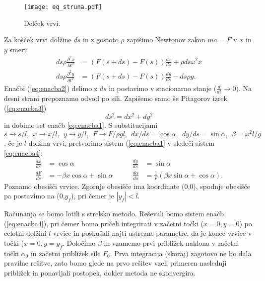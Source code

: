 \documentclass[12pt,a4paper]{article}
\begin{document}
\begin{figure}[H]
    \centering
        \texttt{[image: eq\_struna.pdf]}
    \caption{Delček vrvi.} \label{fig:slika2}
\end{figure}
\noindent Za košček vrvi dolžine $ds$ in z gostoto $\rho$ zapišimo Newtonov zakon $m a=F$ v $x$ in $y$ smeri:
\begin{align} \label{eq:enacba2}
ds \rho \frac{\partial ^{2} x}{\partial t^{2}} & =  (F(s +ds) - F(s)) \frac{dx}{ds} + \rho ds \omega ^{2} x \nonumber \\
ds \rho \frac{\partial ^{2} y}{\partial t^{2}} & =  (F(s +ds) - F(s)) \frac{dy}{ds} - ds \rho g.
\end{align}
Enačbi (\ref{eq:enacba2}) delimo z $ds$ in postavimo v stacionarno stanje ($\frac{d}{dt} \rightarrow 0)$. Na desni strani prepoznamo odvod po sili. Zapišemo samo še Pitagorov izrek (\ref{eq:enacba3})
\begin{equation} \label{eq:enacba3}
ds^{2}  = dx^{2} +dy^{2}
\end{equation}
in dobimo set enačb \ref{eq:enacba1}. S substitucijami $s \rightarrow s/l, \ \ x\rightarrow x/l, \ \ y \rightarrow y/l, \ \ F \rightarrow F/\rho gl, \ \ dx/ds = \cos \alpha, \ \ dy/ds = \sin \alpha, \ \ \beta = \omega ^{2} l/g$, če je $l$ dolžina vrvi, pretvorimo sistem (\ref{eq:enacba1} v sledeči sistem \ref{eq:enacba4}:
 \begin{align} \label{eq:enacba4}
 \frac{dx}{ds} &= \cos \alpha  &\qquad \frac{dy}{ds} & = \sin \alpha \nonumber \\ 
 \frac{dF}{ds}& = -\beta x \cos \alpha + \sin \alpha & \qquad \frac{d \alpha }{ds} &= \frac{1}{F} \left( \beta x \sin \alpha + \cos \alpha \right).
 \end{align}
Poznamo obesišči vrvice. Zgornje obesišče ima koordinate (0,0), spodnje obesišče pa postavimo na (0,$y_f$), pri čemer je $|y_f| < l$.

Računanja se bomo lotili s strelsko metodo. Reševali bomo sistem enačb (\ref{eq:enacba4}), pri čemer bomo pričeli integrirati v začetni točki ($x=0,y=0$) po celotni dolžini $l$ vrvice in poskušali najti ustrezne parametre, da je konec vrvice v točki ($x=0,y=y_f$. Določimo $\beta$ in vzamemo prvi približek naklona v začetni točki $\alpha _0$ in začetni približek sile $F_0$. Prva integracija (skoraj) zagotovo ne bo dala pravilne rešitve, zato bomo glede na prvo rešitev vzeli primeren naslednji približek in ponavljali postopek, dokler metoda ne skonvergira.
\end{document}
